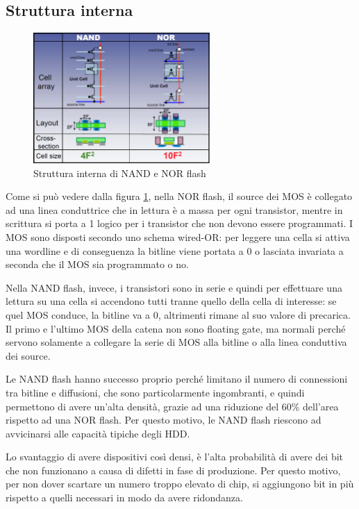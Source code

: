 \documentclass[11pt,4paper]{report}
\begin{document}
\subsection{Struttura interna}
\begin{figure}[hbtp]
	\centering
	\includegraphics[width=0.6\textwidth]{memorie/jc_struttura_interna}
	\caption{Struttura interna di NAND e NOR flash}
	\label{fig:jc_struttura_interna}
\end{figure}
Come si può vedere dalla figura \ref{fig:jc_struttura_interna}, nella NOR flash, il source dei MOS è collegato ad una linea conduttrice che in lettura è a massa per ogni transistor, mentre in scrittura si porta a 1 logico per i transistor che non devono essere programmati. I MOS sono disposti secondo uno schema wired-OR: per leggere una cella si attiva una wordline e di conseguenza la bitline viene portata a 0 o lasciata invariata a seconda che il MOS sia programmato o no.

Nella NAND flash, invece, i transistori sono in serie e quindi per effettuare una lettura su una cella si accendono tutti tranne quello della cella di interesse: se quel MOS conduce, la bitline va a 0, altrimenti rimane al suo valore di precarica. Il primo e l'ultimo MOS della catena non sono floating gate, ma normali perché servono solamente a collegare la serie di MOS alla bitline o alla linea conduttiva dei source.

Le NAND flash hanno successo proprio perché limitano il numero di connessioni tra bitline e diffusioni, che sono particolarmente ingombranti, e quindi permettono di avere un'alta densità, grazie ad una riduzione del 60\% dell'area rispetto ad una NOR flash. Per questo motivo, le NAND flash riescono ad avvicinarsi alle capacità tipiche degli HDD.

Lo svantaggio di avere dispositivi così densi, è l'alta probabilità di avere dei bit che non funzionano a causa di difetti in fase di produzione. Per questo motivo, per non dover scartare un numero troppo elevato di chip, si aggiungono bit in più rispetto a quelli necessari in modo da avere ridondanza.
\end{document}
